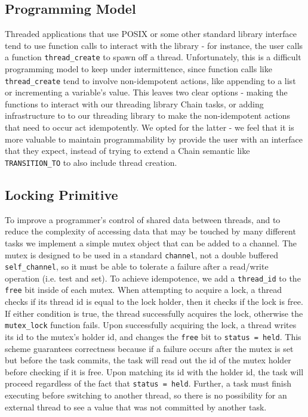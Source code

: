 \documentclass[11pt]{sensys-proc}
\newcommand{\chain}{Chain\xspace}
\begin{document}
\subsection{Programming Model}
Threaded applications that use POSIX or some other standard library interface
tend to use function calls to interact with the library - for instance, the
user calls a function \texttt{thread\_create} to spawn off a thread.
Unfortunately, this is a difficult programming model to keep under
intermittence, since function calls like \texttt{thread\_create} tend to
involve non-idempotent actions, like appending to a list or incrementing a
variable's value. This leaves two clear options - making the functions to
interact with our threading library \chain tasks, or adding infrastructure to
to our threading library to make the non-idempotent actions that need to occur
act idempotently. We opted for the latter - we feel that it is more valuable to
maintain programmability by provide the user with an interface that they
expect, instead of trying to extend a \chain semantic like
\texttt{TRANSITION\_TO} to also include thread creation.


\subsection{Locking Primitive}
To improve a programmer's control of shared data between threads, and to reduce
the complexity of accessing data that may be touched by many different tasks we
implement a simple mutex object that can be added to a channel. The mutex is
designed to be used in a standard \texttt{channel}, not a double buffered
\texttt{self\_channel}, so it must be able to tolerate a failure after a
read/write operation (i.e. test and set). To achieve idempotence, we add a
\texttt{thread\_id} to the \texttt{free} bit inside of each mutex. When
attempting to acquire a lock, a thread checks if its thread id is equal to the
lock holder, then it checks if the lock is free. If either condition is true,
the thread successfully acquires the lock, otherwise the \texttt{mutex\_lock}
function fails. Upon successfully acquiring the lock, a thread writes its id to
the mutex's holder id, and changes the \texttt{free} bit to \texttt{status =
held}. This scheme guarantees correctness because if a failure occurs after the
mutex is set but before the task commits, the task will read out the id of the
mutex holder before checking if it is free. Upon matching its id with the holder
id, the task will proceed regardless of the fact that \texttt{status = held}.
Further, a task must finish executing before switching to another thread, so
there is no possibility for an external thread to see a value that was not
committed by another task.
\end{document}

